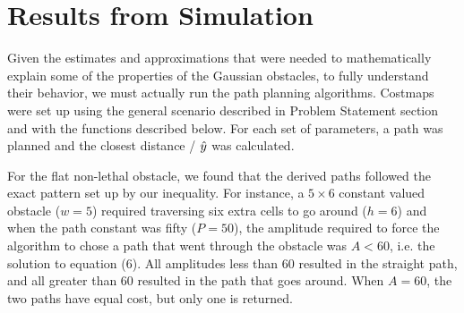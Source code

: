 \section{Results from Simulation}



Given the estimates and approximations that were needed to mathematically explain some of the properties of the Gaussian obstacles, to fully understand their behavior, we must actually run the path planning algorithms. Costmaps were set up using the general scenario described in Problem Statement section and with the functions described below. For each set of parameters, a path was planned and the closest distance / $\hat{y}$ was calculated. 

For the flat non-lethal obstacle, we found that the derived paths followed the exact pattern set up by our inequality. For instance, a $5\times6$ constant valued obstacle ($w=5$) required traversing six extra cells to go around ($h=6$) and when the path constant was fifty ($P=50$), the amplitude required to force the algorithm to chose a path that went through the obstacle was $A<60$, i.e. the solution to equation (6). All amplitudes less than 60 resulted in the straight path, and all greater than 60 resulted in the path that goes around. When $A=60$, the two paths have equal cost, but only one is returned.

